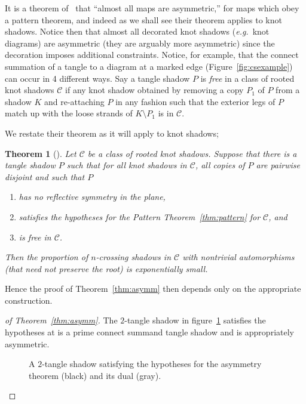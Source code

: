 \documentclass[submission%
]{dmtcs}
\newtheorem*{untheorem}{Theorem}
\begin{document}
It is a theorem of~\cite{Richmond19951} that ``almost all maps are
asymmetric,'' for maps which obey a pattern theorem, and indeed as we
shall see their theorem applies to knot shadows. Notice then that
almost all decorated knot shadows (\textit{e.g.}\ knot diagrams) are
asymmetric (they are arguably more asymmetric) since the decoration
imposes additional constraints. Notice, for example, that the connect
summation of a tangle to a diagram at a marked edge
(Figure~\ref{fig:csexample}) can occur in 4 different ways. Say a
tangle shadow $P$ is \emph{free} in a class of rooted knot shadows
$\mathscr{C}$ if any knot shadow obtained by removing a copy $P_1$ of
$P$ from a shadow $K$ and re-attaching $P$ in any fashion such that
the exterior legs of $P$ match up with the loose strands of $K
\setminus P_1$ is in $\mathscr{C}$.

We restate their theorem as it will apply to knot shadows;

\begin{untheorem}[\cite{Richmond19951}]
  Let $\mathscr{C}$ be a class of rooted knot shadows. Suppose that
  there is a tangle shadow $P$ such that for all knot shadows in
  $\mathscr{C}$, all copies of $P$ are pairwise disjoint and such that $P$
  \begin{enumerate}
  \item has no reflective symmetry in the plane,
  \item satisfies the hypotheses for the Pattern
    Theorem~\ref{thm:pattern} for $\mathscr{C}$, and
  \item is free in $\mathscr{C}$.
  \end{enumerate}
  Then the proportion of $n$-crossing shadows in $\mathscr{C}$ with
  nontrivial automorphisms (that need not preserve the root) is
  exponentially small.
\end{untheorem}

Hence the proof of Theorem~\ref{thm:asymm} then depends only on the
appropriate construction.

\begin{proof}[of Theorem~\ref{thm:asymm}] The $2$-tangle shadow in
  figure~\ref{fig:asymtangle} satisfies the hypotheses at is a prime
  connect summand tangle shadow and is appropriately asymmetric.
  \begin{figure}[htbp]
    \centering
    
    \caption{A $2$-tangle shadow satisfying the hypotheses for the
      asymmetry theorem (black) and its dual (gray).}
    \label{fig:asymtangle}
  \end{figure}
\end{proof}
\end{document}
